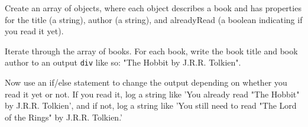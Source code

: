 \documentclass[11pt,a4paper]{report}
\begin{document}
\begin{ex}
Create an array of objects, where each object describes a book and has properties for the title (a string), author (a string), and alreadyRead (a boolean indicating if you read it yet).

Iterate through the array of books. For each book, write the book title and book author to an output \verb|div| like so: "The Hobbit by J.R.R. Tolkien".

Now use an if/else statement to change the output depending on whether you read it yet or not. If you read it, log a string like 'You already read "The Hobbit" by J.R.R. Tolkien', and if not, log a string like 'You still need to read "The Lord of the Rings" by J.R.R. Tolkien.'
\end{ex}
\end{document}
